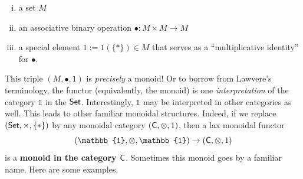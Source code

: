 \documentclass{tufte-handout-tai}
\newcommand{\cat}[1]{{\normalfont\textsf{#1}}}
\theoremstyle{plain}
\theoremstyle{definition}
\theoremstyle{remark}
\begin{document}
	\begin{enumerate}[i)]
		\item a set $M$
		\item an associative binary operation $\bullet\colon M\times M\to M$
		\item a special element $1:=1(\{\ast\})\in M$ that serves as a ``multiplicative identity'' for $\bullet$.
	\end{enumerate} 
This triple $(M,\bullet,1)$ is \textit{precisely} a monoid! Or to borrow from Lawvere's terminology, the functor (equivalently, the monoid)  is one \textit{interpretation} of the category $\mathbb{1}$ in the $\cat{Set}$. Interestingly, $\mathbb{1}$ may be interpreted in other categories as well. This leads to other familiar monoidal structures. Indeed, if we replace $(\cat{Set},\times,\{\ast\})$ by any monoidal category $(\cat{C},\otimes,1)$, then a lax monoidal functor 
\[(\mathbb{1},\otimes,\mathbb{1})\to(\cat{C},\otimes,1) \]
is a \textbf{monoid in the category $\cat{C}$}. Sometimes this monoid goes by a familiar name. Here are some examples.\newpage
\end{document}
